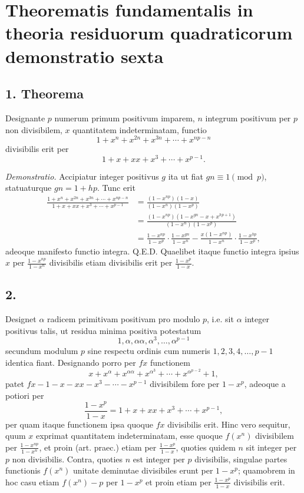 \documentclass[12pt]{article}
\begin{document}
\section*{Theorematis fundamentalis in theoria residuorum quadraticorum demonstratio sexta}

\subsection*{1. Theorema}

Designante $p$ numerum primum positivum imparem, $n$ integrum positivum per $p$ non divisibilem, $x$ quantitatem indeterminatam, functio
\[
1+x^n+x^{2n}+x^{3n}+\cdots+x^{np-n}
\]
divisibilis erit per
\[
1+x+xx+x^3+\cdots+x^{p-1}.
\]

\emph{Demonstratio.} Accipiatur integer positivus $g$ ita ut fiat $gn\equiv1\pmod p$, statuaturque $gn=1+hp$. Tunc erit
\[
\begin{aligned}
\frac{1+x^n+x^{2n}+x^{3n}+\cdots+x^{np-n}}{1+x+xx+x^3+\cdots+x^{p-1}}
&=\frac{(1-x^{np})(1-x)}{(1-x^n)(1-x^p)}\\
&=\frac{(1-x^{np})(1-x^{gn}-x+x^{hp+1})}{(1-x^n)(1-x^p)}\\
&=\frac{1-x^{np}}{1-x^p}\cdot\frac{1-x^{gn}}{1-x^n}
-\frac{x(1-x^{np})}{1-x^n}\cdot\frac{1-x^{hp}}{1-x^p},
\end{aligned}
\]
adeoque manifesto functio integra. Q.E.D. Quaelibet itaque functio integra ipsius $x$ per $\frac{1-x^{np}}{1-x^n}$ divisibilis etiam divisibilis erit per $\frac{1-x^p}{1-x}$.

\subsection*{2.}

Designet $\alpha$ radicem primitivam positivam pro modulo $p$, i.e. sit $\alpha$ integer positivus talis, ut residua minima positiva potestatum
\[
1,\alpha,\alpha\alpha,\alpha^3,\ldots,\alpha^{p-1}
\]
secundum modulum $p$ sine respectu ordinis cum numeris $1,2,3,4,\ldots,p-1$ identica fiant. Designando porro per $fx$ functionem
\[
x+x^\alpha+x^{\alpha\alpha}+x^{\alpha^3}+\cdots+x^{\alpha^{p-2}}+1,
\]
patet $fx-1-x-xx-x^3-\cdots-x^{p-1}$ divisibilem fore per $1-x^p$, adeoque a potiori per
\[
\frac{1-x^p}{1-x}=1+x+xx+x^3+\cdots+x^{p-1},
\]
per quam itaque functionem ipsa quoque $fx$ divisibilis erit. Hinc vero sequitur, quum $x$ exprimat quantitatem indeterminatam, esse quoque $f(x^n)$ divisibilem per $\frac{1-x^{np}}{1-x^n}$, et proin (art. praec.) etiam per $\frac{1-x^p}{1-x}$, quoties quidem $n$ sit integer per $p$ non divisibilis. Contra, quoties $n$ est integer per $p$ divisibilis, singulae partes functionis $f(x^n)$ unitate deminutae divisibiles erunt per $1-x^p$; quamobrem in hoc casu etiam $f(x^n)-p$ per $1-x^p$ et proin etiam per $\frac{1-x^p}{1-x}$ divisibilis erit.
\end{document}
